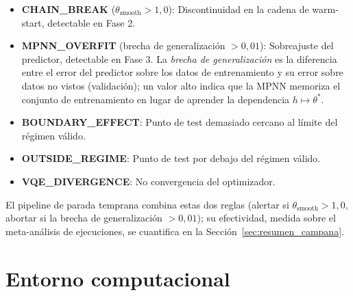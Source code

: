 \documentclass[11pt,a4paper,spanish]{book}
\begin{document}
\begin{itemize}
    \item \textbf{CHAIN\_BREAK} ($\theta_{\text{smooth}} > 1,0$): Discontinuidad en la cadena de warm-start, detectable en Fase 2.
    \item \textbf{MPNN\_OVERFIT} (brecha de generalización $> 0,01$): Sobreajuste del predictor, detectable en Fase 3. La \emph{brecha de generalización} es la diferencia entre el error del predictor sobre los datos de entrenamiento y su error sobre datos no vistos (validación); un valor alto indica que la MPNN memoriza el conjunto de entrenamiento en lugar de aprender la dependencia $h \mapsto \theta^*$.
    \item \textbf{BOUNDARY\_EFFECT}: Punto de test demasiado cercano al límite del régimen válido.
    \item \textbf{OUTSIDE\_REGIME}: Punto de test por debajo del régimen válido.
    \item \textbf{VQE\_DIVERGENCE}: No convergencia del optimizador.
\end{itemize}

El pipeline de parada temprana combina estas dos reglas (alertar si $\theta_{\text{smooth}} > 1,0$, abortar si la brecha de generalización $> 0,01$); su efectividad, medida sobre el meta-análisis de ejecuciones, se cuantifica en la Sección~\ref{sec:resumen_campana}.

\section{Entorno computacional}
\end{document}
